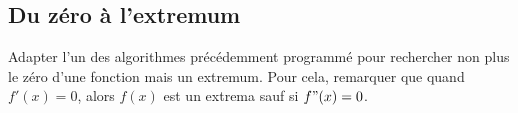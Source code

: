 \subsection{Du zéro à l'extremum}
Adapter l'un des algorithmes précédemment programmé pour rechercher non plus 
le zéro d'une fonction mais un extremum. Pour cela, remarquer que quand
 $f'(x)=0$, alors $f(x)$ est un extrema sauf si $f"(x) = 0$. 
